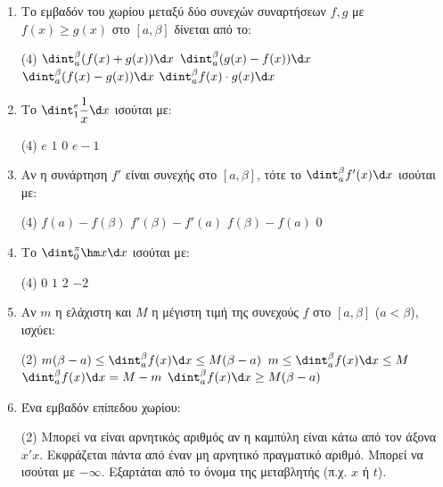 \begin{enumerate}[label=\textbf{3.\arabic*.}, itemsep=4mm]
    \item Το εμβαδόν του χωρίου μεταξύ δύο συνεχών συναρτήσεων $f, g$ με $f(x) \ge g(x)$ στο $[a, \beta]$ δίνεται από το:
    \begin{tasks}[label=\let\textdexiakeraia\relax\alph*.](4)
        \task $\dint_a^\beta (f(x) + g(x)) \d x$
        \task $\dint_a^\beta (g(x) - f(x)) \d x$
        \task $\dint_a^\beta (f(x) - g(x)) \d x$
        \task $\dint_a^\beta f(x) \cdot g(x) \d x$
    \end{tasks}

    \item Το $\dint_1^e \dfrac{1}{x} \d x$ ισούται με:
    \begin{tasks}[label=\let\textdexiakeraia\relax\alph*.](4)
        \task $e$
        \task $1$
        \task $0$
        \task $e-1$
    \end{tasks}

    \item Αν η συνάρτηση $f'$ είναι συνεχής στο $[a, \beta]$, τότε το $\dint_a^\beta f'(x) \d x$ ισούται με:
    \begin{tasks}[label=\let\textdexiakeraia\relax\alph*.](4)
        \task $f(a) - f(\beta)$
        \task $f'(\beta) - f'(a)$
        \task $f(\beta) - f(a)$
        \task $0$
    \end{tasks}

    \item Το $\dint_0^\pi \hm x \d x$ ισούται με:
    \begin{tasks}[label=\let\textdexiakeraia\relax\alph*.](4)
        \task $0$
        \task $1$
        \task $2$
        \task $-2$
    \end{tasks}

    \item Αν $m$ η ελάχιστη και $M$ η μέγιστη τιμή της συνεχούς $f$ στο $[a, \beta]$ ($a<\beta$), ισχύει:
    \begin{tasks}[label=\let\textdexiakeraia\relax\alph*.](2)
        \task $m(\beta-a) \le \dint_a^\beta f(x)\d x \le M(\beta-a)$
        \task $m \le \dint_a^\beta f(x)\d x \le M$
        \task $\dint_a^\beta f(x)\d x = M - m$
        \task $\dint_a^\beta f(x)\d x \ge M(\beta-a)$
    \end{tasks}

    \item Ένα εμβαδόν επίπεδου χωρίου:
    \begin{tasks}[label=\let\textdexiakeraia\relax\alph*.](2)
        \task Μπορεί να είναι αρνητικός αριθμός αν η καμπύλη είναι κάτω από τον άξονα $x'x$.
        \task Εκφράζεται πάντα από έναν μη αρνητικό πραγματικό αριθμό.
        \task Μπορεί να ισούται με $-\infty$.
        \task Εξαρτάται από το όνομα της μεταβλητής (π.χ. $x$ ή $t$).
    \end{tasks}


\end{enumerate}
